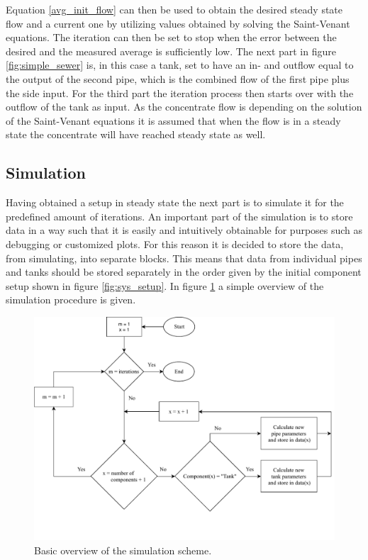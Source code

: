 Equation \ref{avg_init_flow} can then be used to obtain the desired steady state flow and a current one by utilizing values obtained by solving the Saint-Venant equations. The iteration can then be set to stop when the error between the desired and the measured average is sufficiently low. The next part in figure \ref {fig:simple_sewer} is, in this case a tank, set to have an in- and outflow equal to the output of the second pipe, which is the combined flow of the first pipe plus the side input. For the third part the iteration process then starts over with the outflow of the tank as input.
As the concentrate flow is depending on the solution of the Saint-Venant equations it is assumed that when the flow is in a steady state the concentrate will have reached steady state as well.

\subsection*{Simulation}

Having obtained a setup in steady state the next part is to simulate it for the predefined amount of iterations. An important part of the simulation is to store data in a way such that it is easily and intuitively obtainable for purposes such as debugging or customized plots. For this reason it is decided to store the data, from simulating, into separate blocks. This means that data from individual pipes and tanks should be stored separately in the order given by the initial component setup shown in figure \ref{fig:sys_setup}. In figure \ref{fig:simple_simulation} a simple overview of the simulation procedure is given.   

\begin{figure}[H]
\centering
\includegraphics[width=1 \textwidth]{report/simulation/pictures/simple_simulation.pdf}
\caption{Basic overview of the simulation scheme.}
\label{fig:simple_simulation}
\end{figure}


